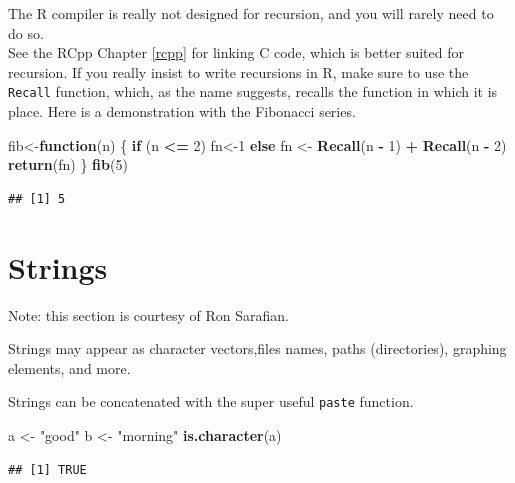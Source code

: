 \documentclass[]{book}
\newenvironment{Shaded}{\begin{snugshade}}{\end{snugshade}}
\newcommand{\ControlFlowTok}[1]{\textcolor[rgb]{0.13,0.29,0.53}{\textbf{#1}}}
\newcommand{\DecValTok}[1]{\textcolor[rgb]{0.00,0.00,0.81}{#1}}
\newcommand{\KeywordTok}[1]{\textcolor[rgb]{0.13,0.29,0.53}{\textbf{#1}}}
\newcommand{\NormalTok}[1]{#1}
\newcommand{\OperatorTok}[1]{\textcolor[rgb]{0.81,0.36,0.00}{\textbf{#1}}}
\newcommand{\StringTok}[1]{\textcolor[rgb]{0.31,0.60,0.02}{#1}}
\theoremstyle{definition}
\theoremstyle{definition}
\theoremstyle{definition}
\theoremstyle{remark}
\begin{document}
The R compiler is really not designed for recursion, and you will rarely need to do so.\\
See the RCpp Chapter \ref{rcpp} for linking C code, which is better suited for recursion.
If you really insist to write recursions in R, make sure to use the \texttt{Recall} function, which, as the name suggests, recalls the function in which it is place.
Here is a demonstration with the Fibonacci series.

\begin{Shaded}
\begin{Highlighting}[]
\NormalTok{fib<-}\ControlFlowTok{function}\NormalTok{(n) \{}
    \ControlFlowTok{if}\NormalTok{ (n }\OperatorTok{<=}\StringTok{ }\DecValTok{2}\NormalTok{) fn<-}\DecValTok{1} 
    \ControlFlowTok{else}\NormalTok{ fn <-}\StringTok{ }\KeywordTok{Recall}\NormalTok{(n }\OperatorTok{-}\StringTok{ }\DecValTok{1}\NormalTok{) }\OperatorTok{+}\StringTok{ }\KeywordTok{Recall}\NormalTok{(n }\OperatorTok{-}\StringTok{ }\DecValTok{2}\NormalTok{) }
    \KeywordTok{return}\NormalTok{(fn)}
\NormalTok{\} }
\KeywordTok{fib}\NormalTok{(}\DecValTok{5}\NormalTok{)}
\end{Highlighting}
\end{Shaded}

\begin{verbatim}
## [1] 5
\end{verbatim}

\hypertarget{strings}{%
\section{Strings}\label{strings}}

Note: this section is courtesy of Ron Sarafian.

Strings may appear as character vectors,files names, paths (directories), graphing elements, and more.

Strings can be concatenated with the super useful \texttt{paste} function.

\begin{Shaded}
\begin{Highlighting}[]
\NormalTok{a <-}\StringTok{ "good"}
\NormalTok{b <-}\StringTok{ "morning"}
\KeywordTok{is.character}\NormalTok{(a)}
\end{Highlighting}
\end{Shaded}

\begin{verbatim}
## [1] TRUE
\end{verbatim}
\end{document}
